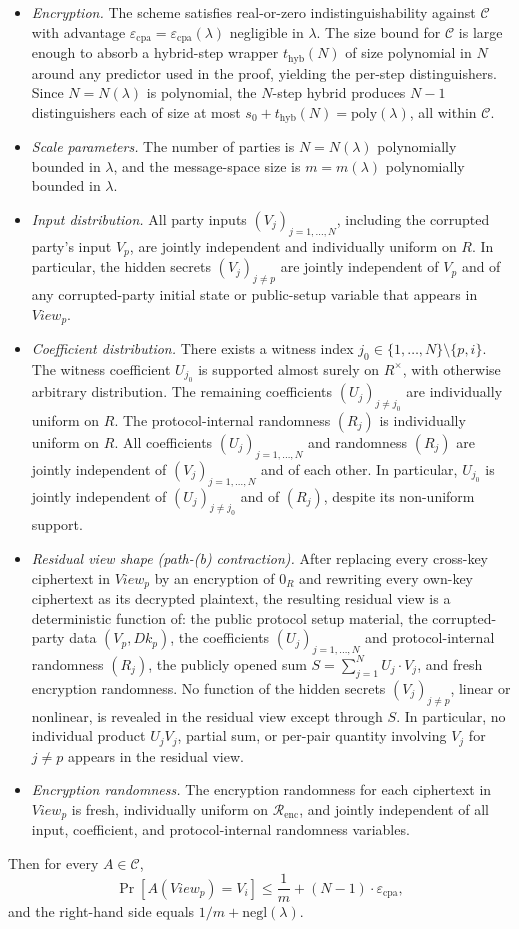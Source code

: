 \documentclass[11pt]{article}
\newcommand{\Renc}{\mathcal{R}_{\mathrm{enc}}}
\newcommand{\epscpa}{\varepsilon_{\mathrm{cpa}}}
\newcommand{\C}{\mathcal{C}}
\newcommand{\Dk}{\mathit{Dk}}
\begin{document}
\begin{itemize}
\item \emph{Encryption.} The scheme satisfies real-or-zero indistinguishability against $\C$ with advantage $\epscpa = \epscpa(\lambda)$ negligible in $\lambda$. The size bound for $\C$ is large enough to absorb a hybrid-step wrapper $t_{\mathrm{hyb}}(N)$ of size polynomial in $N$ around any predictor used in the proof, yielding the per-step distinguishers. Since $N = N(\lambda)$ is polynomial, the $N$-step hybrid produces $N - 1$ distinguishers each of size at most $s_0 + t_{\mathrm{hyb}}(N) = \mathrm{poly}(\lambda)$, all within $\C$.
\item \emph{Scale parameters.} The number of parties is $N = N(\lambda)$ polynomially bounded in $\lambda$, and the message-space size is $m = m(\lambda)$ polynomially bounded in $\lambda$.
\item \emph{Input distribution.} All party inputs $(V_j)_{j=1, \ldots, N}$, including the corrupted party's input $V_p$, are jointly independent and individually uniform on $R$. In particular, the hidden secrets $(V_j)_{j \neq p}$ are jointly independent of $V_p$ and of any corrupted-party initial state or public-setup variable that appears in $\mathit{View}_p$.
\item \emph{Coefficient distribution.} There exists a witness index $j_0 \in \{1, \ldots, N\} \setminus \{p, i\}$. The witness coefficient $U_{j_0}$ is supported almost surely on $R^\times$, with otherwise arbitrary distribution. The remaining coefficients $(U_j)_{j \neq j_0}$ are individually uniform on $R$. The protocol-internal randomness $(R_j)$ is individually uniform on $R$. All coefficients $(U_j)_{j=1, \ldots, N}$ and randomness $(R_j)$ are jointly independent of $(V_j)_{j=1, \ldots, N}$ and of each other. In particular, $U_{j_0}$ is jointly independent of $(U_j)_{j \neq j_0}$ and of $(R_j)$, despite its non-uniform support.
\item \emph{Residual view shape (path-(b) contraction).} After replacing every cross-key ciphertext in $\mathit{View}_p$ by an encryption of $0_R$ and rewriting every own-key ciphertext as its decrypted plaintext, the resulting residual view is a deterministic function of: the public protocol setup material, the corrupted-party data $(V_p, \Dk_p)$, the coefficients $(U_j)_{j=1, \ldots, N}$ and protocol-internal randomness $(R_j)$, the publicly opened sum $S = \sum_{j=1}^{N} U_j \cdot V_j$, and fresh encryption randomness. No function of the hidden secrets $(V_j)_{j \neq p}$, linear or nonlinear, is revealed in the residual view except through $S$. In particular, no individual product $U_j V_j$, partial sum, or per-pair quantity involving $V_j$ for $j \neq p$ appears in the residual view.
\item \emph{Encryption randomness.} The encryption randomness for each ciphertext in $\mathit{View}_p$ is fresh, individually uniform on $\Renc$, and jointly independent of all input, coefficient, and protocol-internal randomness variables.
\end{itemize}
Then for every $A \in \C$,
\[
\Pr[A(\mathit{View}_p) = V_i] \leq \frac{1}{m} + (N-1) \cdot \epscpa,
\]
and the right-hand side equals $1/m + \mathrm{negl}(\lambda)$.
\end{document}
